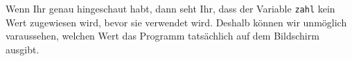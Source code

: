        Wenn Ihr genau hingeschaut habt, dann seht Ihr, dass der Variable \texttt{zahl} kein Wert
        zugewiesen wird, bevor sie verwendet wird. Deshalb können wir unmöglich varaussehen, welchen
        Wert das Programm tatsächlich auf dem Bildschirm ausgibt.
